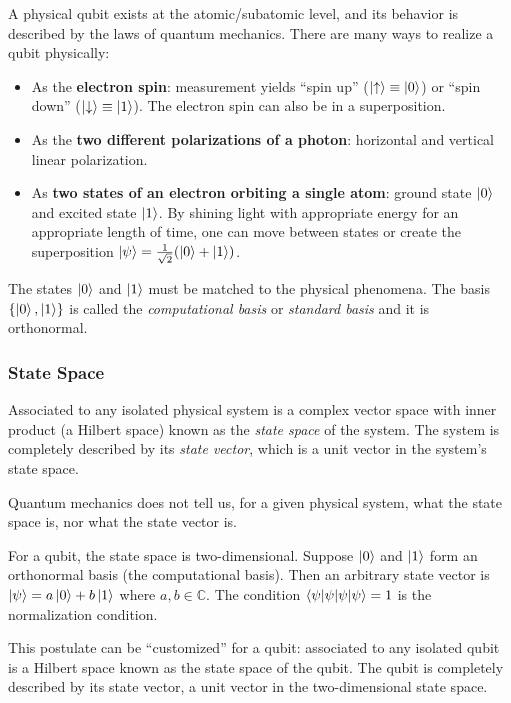 \documentclass[10pt,a4paper]{article}
\begin{document}
A physical qubit exists at the atomic/subatomic level, and its behavior is described by the laws of quantum mechanics. There are many ways to realize a qubit physically:
\begin{itemize}[nosep]
\item As the \textbf{electron spin}: measurement yields ``spin up'' ($\ket{\uparrow}\equiv\ket{0}$) or ``spin down'' ($\ket{\downarrow}\equiv\ket{1}$). The electron spin can also be in a superposition.
\item As the \textbf{two different polarizations of a photon}: horizontal and vertical linear polarization.
\item As \textbf{two states of an electron orbiting a single atom}: ground state $\ket{0}$ and excited state $\ket{1}$. By shining light with appropriate energy for an appropriate length of time, one can move between states or create the superposition $\ket{\psi}=\frac{1}{\sqrt{2}}(\ket{0}+\ket{1})$.
\end{itemize}
The states $\ket{0}$ and $\ket{1}$ must be matched to the physical phenomena. The basis $\{\ket{0},\ket{1}\}$ is called the \emph{computational basis} or \emph{standard basis} and it is orthonormal.

\subsubsection*{State Space}

\begin{tcolorbox}[propstyle, title={Postulate}]
Associated to any isolated physical system is a complex vector space with inner product (a Hilbert space) known as the \emph{state space} of the system. The system is completely described by its \emph{state vector}, which is a unit vector in the system's state space.

Quantum mechanics does not tell us, for a given physical system, what the state space is, nor what the state vector is.
\end{tcolorbox}

For a qubit, the state space is two-dimensional. Suppose $\ket{0}$ and $\ket{1}$ form an orthonormal basis (the computational basis). Then an arbitrary state vector is $\ket{\psi}=a\ket{0}+b\ket{1}$ where $a,b\in\mathbb{C}$. The condition $\braket{\psi|\psi}=1$ is the normalization condition.

This postulate can be ``customized'' for a qubit: associated to any isolated qubit is a Hilbert space known as the state space of the qubit. The qubit is completely described by its state vector, a unit vector in the two-dimensional state space.
\end{document}
